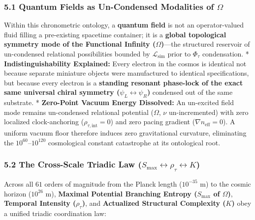 \documentclass[
]{article}
\begin{document}
\subsubsection{\texorpdfstring{5.1 Quantum Fields as Un-Condensed
Modalities of
\(\Omega\)}{5.1 Quantum Fields as Un-Condensed Modalities of \textbackslash Omega}}\label{quantum-fields-as-un-condensed-modalities-of-omega}

Within this chronometric ontology, a \textbf{quantum field} is not an
operator-valued fluid filling a pre-existing spacetime container; it is
a \textbf{global topological symmetry mode of the Functional Infinity
(\(\Omega\))}---the structured reservoir of un-condensed relational
possibilities bounded by \(\mathcal{L}_{\text{sim}}\) prior to
\(\Phi_\tau\) condensation. * \textbf{Indistinguishability Explained:}
Every electron in the cosmos is identical not because separate miniature
objects were manufactured to identical specifications, but because every
electron is a \textbf{standing resonant phase-lock of the exact same
universal chiral symmetry (\(\psi_L \leftrightarrow \psi_R\))} condensed
out of the same substrate. * \textbf{Zero-Point Vacuum Energy
Dissolved:} An un-excited field mode remains un-condensed relational
potential (\(\Omega\), \(\nu\) un-incremented) with zero localized
clock-anchoring (\(\rho_{\tau,\text{int}} = 0\)) and zero pacing
gradient (\(\nabla n_{\text{eff}} = 0\)). A uniform vacuum floor
therefore induces zero gravitational curvature, eliminating the
\(10^{60}\text{–}10^{120}\) cosmological constant catastrophe at its
ontological root.

\subsubsection{\texorpdfstring{5.2 The Cross-Scale Triadic Law
(\(S_{\text{max}} \leftrightarrow \rho_\tau \leftrightarrow K\))}{5.2 The Cross-Scale Triadic Law (S\_\{\textbackslash text\{max\}\} \textbackslash leftrightarrow \textbackslash rho\_\textbackslash tau \textbackslash leftrightarrow K)}}\label{the-cross-scale-triadic-law-s_textmax-leftrightarrow-rho_tau-leftrightarrow-k}

Across all \(61\) orders of magnitude from the Planck length
(\(10^{-35}\text{ m}\)) to the cosmic horizon (\(10^{26}\text{ m}\)),
\textbf{Maximal Potential Branching Entropy (\(S_{\text{max}}\) of
\(\Omega\))}, \textbf{Temporal Intensity (\(\rho_\tau\))}, and
\textbf{Actualized Structural Complexity (\(K\))} obey a unified triadic
coordination law:
\end{document}

